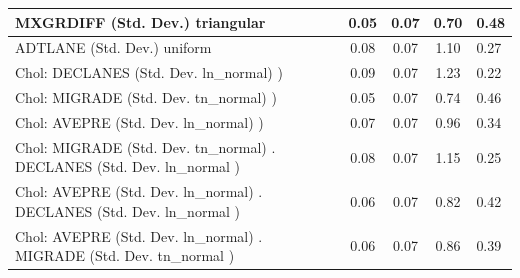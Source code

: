 \begin{table}
\begin{center}
\begin{tabular}{|l|l|c|c|c|l|}
			\hline
			MXGRDIFF (Std. Dev.) triangular &  & 0.05 & 0.07 & 0.70 & 0.48 \\
			\hline
			ADTLANE (Std. Dev.) uniform &  & 0.08 & 0.07 & 1.10 & 0.27 \\
			\hline
			 Chol: DECLANES (Std. Dev. ln_normal) ) &  & 0.09 & 0.07 & 1.23 & 0.22 \\
			\hline
			 Chol: MIGRADE (Std. Dev. tn_normal) ) &  & 0.05 & 0.07 & 0.74 & 0.46 \\
			\hline
			 Chol: AVEPRE (Std. Dev. ln_normal) ) &  & 0.07 & 0.07 & 0.96 & 0.34 \\
			\hline
			 Chol: MIGRADE (Std. Dev. tn_normal) . DECLANES (Std. Dev.   ln_normal ) &  & 0.08 & 0.07 & 1.15 & 0.25 \\
			\hline
			 Chol: AVEPRE (Std. Dev. ln_normal) . DECLANES (Std. Dev.   ln_normal ) &  & 0.06 & 0.07 & 0.82 & 0.42 \\
			\hline
			 Chol: AVEPRE (Std. Dev. ln_normal) . MIGRADE (Std. Dev.   tn_normal ) &  & 0.06 & 0.07 & 0.86 & 0.39 \\
			\hline
		\end{tabular}
	\end{center}
\end{table}